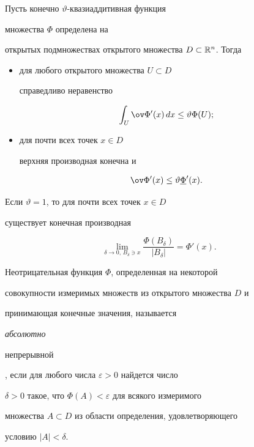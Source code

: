 \begin{prop}


Пусть конечно $\vartheta$-квазиаддитивная функция


множества $\Phi$ определена на


открытых подмножествах открытого множества $D\subset{\Bbb R}^n$. Тогда


\begin{itemize}


\item[a)] для любого открытого множества $U\subset D$


справедливо неравенство


$$


\int_{U}\ov\Phi{}'(x)\,dx\leq \vartheta\Phi(U);


$$


\item[б)] для почти всех точек $x\in D$


верхняя производная конечна и


$$


\ov\Phi{}'(x)\leq \vartheta\underline\Phi'(x).


$$


\end{itemize}


Если $\vartheta=1$, то для почти всех точек $x\in D$


существует конечная производная


$$


\lim_{\delta\to 0,\,B_{\delta}\ni x}


\frac{\Phi(B_{\delta})}{|B_{\delta}|}=\Phi'(x).


$$


\end{prop}





Неотрицательная функция $\Phi$, определенная на некоторой


совокупности измеримых множеств из открытого множества $D$ и


принимающая конечные значения, называется {\it абсолютно


непрерывной}, если для любого числа $\varepsilon>0$ найдется число


$\delta>0$ такое, что $\Phi(A)<\varepsilon$ для всякого измеримого


множества $A\subset D$ из области определения, удовлетворяющего


условию $|A|<\delta$.





